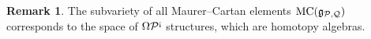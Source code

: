 \documentclass[11pt]{amsart}
\numberwithin{equation}{section}
\newtheorem{prop}[theo]{Proposition}
\newtheorem{coro}[theo]{Corollary}
\theoremstyle{definition}
\newtheorem{rmk}[theo]{Remark}
\newcommand{\mc}{\mathcal}
\newcommand{\mf}{\mathfrak}
\DeclareMathOperator{\Hom}{Hom}
\newcommand{\Alg}{{\textup{Alg}}}
\newcommand{\ash}{{\textup{\mbox{!`}}}}
\newcommand{\Op}{{\textup{Op}}}
\newcommand{\Ss}{{{\mf{S}}}}
\newcommand{\MC}{{{\textup{MC}}}}
\newcommand{\0}{{\textbf{0}}}
\newcommand{\DG}{{\textup{DG}}}
\newcommand{\g}{{\mf{g}}}
\def\PP{{\mc P}}
\def\QQ{{\mc Q}}
\def\gf{\mathfrak{g}}
\def \mf{\mathfrak}
\def \Op{\mathrm{Op}}
\begin{document}
\begin{rmk}
	The subvariety of all Maurer--Cartan elements $\MC(\gf_{\PP,\QQ})$ corresponds to the space of $\Omega \PP^\ash$ structures, which are homotopy algebras.
\end{rmk}






%
\end{document}
